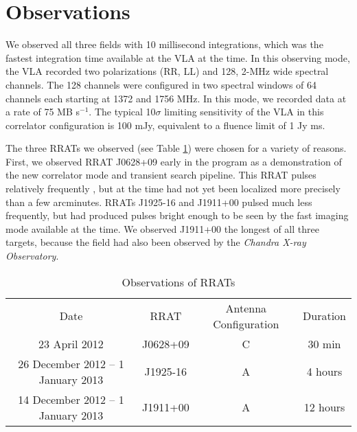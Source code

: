 \section{Observations}

We observed all three fields with 10 millisecond integrations, which was the fastest integration time available at the VLA at the time. In this observing mode, the VLA recorded two polarizations (RR, LL) and 128, 2-MHz wide spectral channels. The 128 channels were configured in two spectral windows of 64 channels each starting at 1372 and 1756 MHz. In this mode, we recorded data at a rate of 75 MB s$^{-1}$. The typical 10$\sigma$ limiting sensitivity of the VLA in this correlator configuration is 100 mJy, equivalent to a fluence limit of 1 Jy ms.

The three RRATs we observed (see Table \ref{tab:obs}) were chosen for a variety of reasons. First, we observed RRAT J0628+09 early in the program as a demonstration of the new correlator mode and transient search pipeline. This RRAT pulses relatively frequently \citep[141 bursts per hour seen by Arecibo;][]{2009ApJ...703.2259D}, but at the time had not yet been localized more precisely than a few arcminutes. RRATs J1925-16 and J1911+00 pulsed much less frequently, but had produced pulses bright enough to be seen by the fast imaging mode available at the time. We observed J1911+00 the longest of all three targets, because the field had also been observed by the \emph{Chandra X-ray Observatory}.

\begin{table} 
    \begin{tabular}{ c c c c }
        Date & RRAT & Antenna Configuration & Duration \\ 
         23 April 2012 & J0628+09 & C & 30 min \\ 
         26 December 2012 -- 1 January 2013 & J1925-16 & A & 4 hours \\ 
         14 December 2012 -- 1 January 2013 & J1911+00 & A & 12 hours \\
    \end{tabular} 
    \caption{Observations of RRATs \label{tab:obs}} 
\end{table}
 
  
  
  